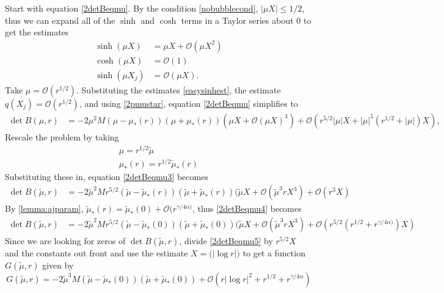 \documentclass[thesis.tex]{subfiles}
\begin{document}
Start with equation \cref{2detBeqmu}. By the condition \cref{nobubblecond}, $|\mu X| \leq 1/2$, thus we can expand all of the $\sinh$ and $\cosh$ terms in a Taylor series about 0 to get the estimates
\begin{equation}\label{easysinhest}
\begin{aligned}
\sinh(\mu X) &= \mu X + \mathcal{O}(\mu X^2) \\
\cosh(\mu X) &= \mathcal{O}(1) \\
\sinh(\mu X_j) &= \mathcal{O}(\mu X).
\end{aligned}
\end{equation}
Take $\mu = \mathcal{O}(r^{1/2})$. Substituting the estimates \cref{easysinhest}, the estimate $q(X_j) = \mathcal{O}(r^{1/2})$, and using \cref{2pmustar}, equation \cref{2detBeqmu} simplifies to
\begin{equation}\label{2detBeqmu3}
\begin{aligned}
\det B(\mu, r) &= -2 \mu^2 M (\mu - \mu_*(r)) (\mu + \mu_*(r)) ( \mu X + \mathcal{O}(\mu X)^3) + \mathcal{O}\left( r^{5/2}|\mu|X + |\mu|^5(r^{1/2} + |\mu|)X \right),
\end{aligned}
\end{equation}
Rescale the problem by taking
\begin{align*}
\mu = r^{1/2}\tilde{\mu} \\
\mu_*(r) = r^{1/2}\tilde{\mu}_*(r)
\end{align*}
Substituting these in, equation \cref{2detBeqmu3} becomes
\begin{equation}\label{2detBeqmu4}
\begin{aligned}
\det B(\tilde{\mu}, r) &= -2 \tilde{\mu}^2 M r^{5/2} (\tilde{\mu} - \tilde{\mu}_*(r)) (\tilde{\mu} + \tilde{\mu}_*(r))( \tilde{\mu} X + \mathcal{O}(\tilde{\mu}^3 r X^3) + \mathcal{O}\left( r^3 X \right)
\end{aligned}
\end{equation}
By \cref{lemma:ajparam}, $\tilde{\mu}_*(r) = \tilde{\mu}_*(0) + \mathcal{O}(r^{\gamma/4 \alpha)}$, thus \cref{2detBeqmu4} becomes
\begin{equation}\label{2detBeqmu5}
\begin{aligned}
\det B(\tilde{\mu}, r) &= -2 \tilde{\mu}^2 M r^{5/2} (\tilde{\mu} - \tilde{\mu}_*(0)) (\tilde{\mu} + \tilde{\mu}_*(0))( \tilde{\mu} X + \mathcal{O}(\tilde{\mu}^3 r X^3) + \mathcal{O}\left( r^{5/2} \left( r^{1/2} + r^{\gamma/4 \alpha)} \right) X \right)
\end{aligned}
\end{equation}
Since we are looking for zeros of $\det B(\tilde{\mu}, r)$, divide \cref{2detBeqmu5} by $r^{5/2}X$ and the constants out front and use the estimate $X = \mathcal(|\log r|)$ to get a function $G(\tilde{\mu}, r)$ given by
\begin{equation}\label{2peigG}
G(\tilde{\mu}, r) = -2 \tilde{\mu}^3 M (\tilde{\mu} - \tilde{\mu}_*(0)) (\tilde{\mu} + \tilde{\mu}_*(0)) + \mathcal{O}\left( r |\log r|^2  + r^{1/2} + r^{\gamma/4 \alpha} \right)
\end{equation}
\end{document}
